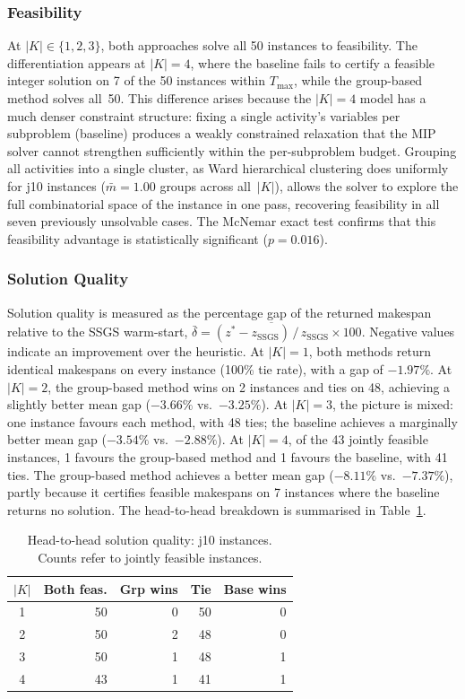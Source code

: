\subsubsection*{Feasibility}
At $|K| \in \{1,2,3\}$, both approaches solve all 50 instances
to feasibility. The differentiation appears at $|K|=4$,
where the baseline fails to certify a feasible integer solution
on 7 of the 50 instances within $T_{\max}$, while the
group-based method solves all~50. This difference arises because
the $|K|=4$ model has a much denser constraint structure: fixing
a single activity's variables per subproblem (baseline) produces
a weakly constrained relaxation that the MIP solver cannot
strengthen sufficiently within the per-subproblem budget.
Grouping all activities into a single cluster, as Ward
hierarchical clustering does uniformly for j10 instances
($\bar{m}=1.00$ groups across all~$|K|$), allows the solver to
explore the full combinatorial space of the instance in one
pass, recovering feasibility in all seven previously unsolvable
cases. The McNemar exact test confirms that this feasibility
advantage is statistically significant ($p = 0.016$).
\subsubsection*{Solution Quality}
Solution quality is measured as the percentage gap of the
returned makespan relative to the SSGS warm-start,
$\bar{\delta} = \overline{(z^* - z_{\mathrm{SSGS}})\,/\,
z_{\mathrm{SSGS}}} \times 100$.
Negative values indicate an improvement over the heuristic.
At $|K|=1$, both methods return identical makespans on every
instance (100\% tie rate), with a gap of $-1.97\%$.
At $|K|=2$, the group-based method wins on 2 instances and ties
on 48, achieving a slightly better mean gap ($-3.66\%$
vs.\ $-3.25\%$). At $|K|=3$, the picture is mixed: one instance
favours each method, with 48 ties; the baseline achieves a
marginally better mean gap ($-3.54\%$ vs.\ $-2.88\%$).
At $|K|=4$, of the 43 jointly feasible instances, 1 favours the
group-based method and 1 favours the baseline, with 41 ties.
The group-based method achieves a better mean gap ($-8.11\%$
vs.\ $-7.37\%$), partly because it certifies feasible
makespans on 7 instances where the baseline returns no solution.
The head-to-head breakdown is summarised in
Table~\ref{tab:j10_headtohead}.
\begin{table}[htbp]
\centering
\renewcommand{\arraystretch}{1.35}
\caption{Head-to-head solution quality: j10 instances.
         Counts refer to jointly feasible instances.}
\label{tab:j10_headtohead}
\begin{tabular}{c r r r r}
\hline
$|K|$ &
\textbf{Both feas.} &
\textbf{Grp wins} &
\textbf{Tie} &
\textbf{Base wins} \\
\hline
1 & 50 &  0 & 50 & 0 \\
2 & 50 &  2 & 48 & 0 \\
3 & 50 &  1 & 48 & 1 \\
4 & 43 &  1 & 41 & 1 \\
\hline
\end{tabular}
\end{table}
